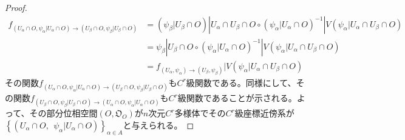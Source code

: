 \documentclass[dvipdfmx]{jsarticle}
\begin{document}
\begin{proof}
\begin{comment}
&= V\left( \psi_{\alpha}|U_{\alpha} \cap U_{\beta} \cap O \right)\overset{f_{\left( U_{\alpha},\psi_{\alpha} \right) \rightarrow \left( U_{\beta},\psi_{\beta} \right)}}{\rightarrow}V\left( \psi_{\beta}|U_{\alpha} \cap U_{\beta} \cap O \right)\\
&= f_{\left( U_{\alpha},\psi_{\alpha} \right) \rightarrow \left( U_{\beta},\psi_{\beta} \right)}|V\left( \psi_{\alpha}|U_{\alpha} \cap U_{\beta} \cap O \right)
\end{align*}
\end{comment}
\begin{align*}
f_{\left( U_{\alpha} \cap O,\psi_{\alpha}|U_{\alpha} \cap O \right) \rightarrow \left( U_{\beta} \cap O,\psi_{\beta}|U_{\beta} \cap O \right)} &= \left( \psi_{\beta}|U_{\beta} \cap O \right)|U_{\alpha} \cap U_{\beta} \cap O \circ \left( \psi_{\alpha}|U_{\alpha} \cap O \right)^{- 1}|V\left( \psi_{\alpha}|U_{\alpha} \cap U_{\beta} \cap O \right)\\
&= \psi_{\beta}|U_{\beta} \cap O \circ \left( \psi_{\alpha}|U_{\alpha} \cap O \right)^{- 1}|V\left( \psi_{\alpha}|U_{\alpha} \cap U_{\beta} \cap O \right)\\
&= f_{\left( U_{\alpha},\psi_{\alpha} \right) \rightarrow \left( U_{\beta},\psi_{\beta} \right)}|V\left( \psi_{\alpha}|U_{\alpha} \cap U_{\beta} \cap O \right)
\end{align*}
その関数$f_{\left( U_{\alpha} \cap O,\psi_{\alpha}|U_{\alpha} \cap O \right) \rightarrow \left( U_{\beta} \cap O,\psi_{\beta}|U_{\beta} \cap O \right)}$も$C^{r}$級関数である。同様にして、その関数$f_{\left( U_{\beta} \cap O,\psi_{\beta}|U_{\beta} \cap O \right) \rightarrow \left( U_{\alpha} \cap O,\psi_{\alpha}|U_{\alpha} \cap O \right)}$も$C^{r}$級関数であることが示される。よって、その部分位相空間$\left( O,\mathfrak{O}_{O} \right)$が$n$次元$C^{r}$多様体でその$C^{r}$級座標近傍系が$\left\{ \left( U_{\alpha} \cap O,\ \ \psi_{\alpha}|U_{\alpha} \cap O \right) \right\}_{\alpha \in A}$と与えられる。
\end{proof}
\end{document}
